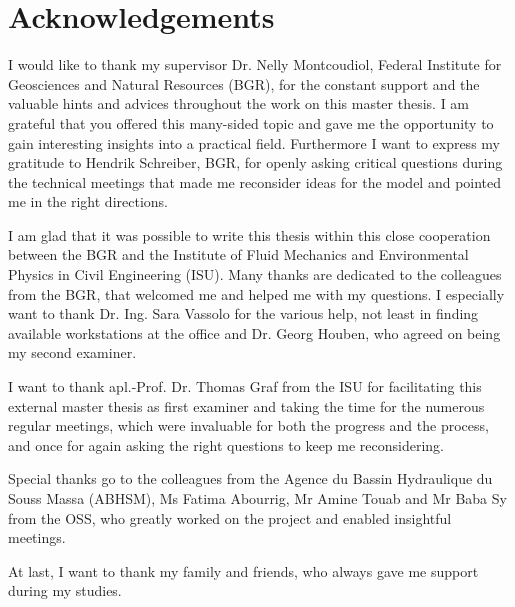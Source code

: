 \thispagestyle{plain}
\section*{Acknowledgements}

I would like to thank my supervisor Dr. Nelly Montcoudiol, Federal Institute for Geosciences and Natural Resources (BGR), for the constant support and the valuable hints and advices throughout the work on this master thesis. I am grateful that you offered this many-sided topic and gave me the opportunity to gain interesting insights into a practical field. Furthermore I want to express my gratitude to Hendrik Schreiber, BGR, for openly asking critical questions during the technical meetings that made me reconsider ideas for the model and pointed me in the right directions.

I am glad that it was possible to write this thesis within this close cooperation between the BGR and the Institute of Fluid Mechanics and Environmental Physics in Civil Engineering (ISU). Many thanks are dedicated to the colleagues from the BGR, that welcomed me and helped me with my questions. I especially want to thank Dr. Ing. Sara Vassolo for the various help, not least in finding available workstations at the office and Dr. Georg Houben, who agreed on being my second examiner.

I want to thank apl.-Prof. Dr. Thomas Graf from the ISU for facilitating this external master thesis as first examiner and taking the time for the numerous regular meetings, which were invaluable for both the progress and the process, and once for again asking the right questions to keep me reconsidering.

Special thanks go to the colleagues from the Agence du Bassin Hydraulique du Souss Massa (ABHSM), Ms Fatima Abourrig, Mr Amine Touab and Mr Baba Sy from the OSS, who greatly worked on the project and enabled insightful meetings.

At last, I want to thank my family and friends, who always gave me support during my studies.